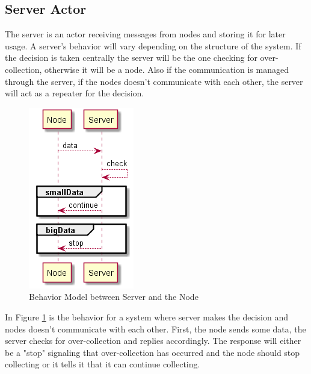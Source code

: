 

\subsection{Server Actor}

The server is an actor receiving messages from nodes and storing it for later usage. A server's behavior will vary depending on the structure of the system. If the decision is taken centrally the server will be the one checking for over-collection, otherwise it will be a node. Also if the communication is managed through the server, if the nodes doesn't communicate with each other, the server will act as a repeater for the decision. 

\begin{figure}[ht]
    \includegraphics{include/figures/server_behav}
    \caption{Behavior Model between Server and the Node}
    \label{fig:node_server_behav}
\end{figure}

In Figure \ref{fig:node_server_behav} is the behavior for a system where server makes the decision and nodes doesn't communicate with each other. First, the node sends some data, the server checks for over-collection and replies accordingly. The response will either be a "stop" signaling that over-collection has occurred and the node should stop collecting or it tells it that it can continue collecting. 

